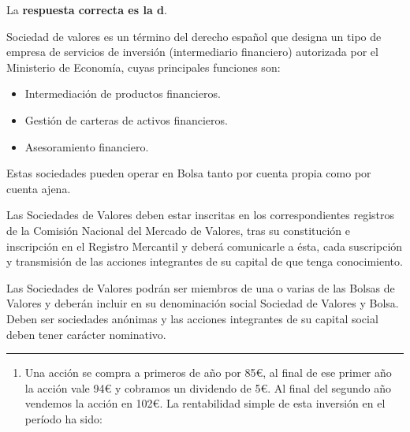 \documentclass[
  letterpaper,
  DIV=11,
  numbers=noendperiod]{scrreprt}
\providecommand{\tightlist}{%
  \setlength{\itemsep}{0pt}\setlength{\parskip}{0pt}}\usepackage{longtable,booktabs,array}
\begin{document}
\begin{tcolorbox}[enhanced jigsaw, left=2mm, opacityback=0, colback=white, breakable, arc=.35mm, bottomrule=.15mm, rightrule=.15mm, toprule=.15mm, leftrule=.75mm, colframe=quarto-callout-tip-color-frame]
\begin{minipage}[t]{5.5mm}
\textcolor{quarto-callout-tip-color}{\faLightbulb}
\end{minipage}%
\begin{minipage}[t]{\textwidth - 5.5mm}

La \textbf{respuesta correcta es la d}.

Sociedad de valores es un término del derecho español que designa un
tipo de empresa de servicios de inversión (intermediario financiero)
autorizada por el Ministerio de Economía, cuyas principales funciones
son:

\begin{itemize}
\item
  Intermediación de productos financieros.
\item
  Gestión de carteras de activos financieros.
\item
  Asesoramiento financiero.
\end{itemize}

Estas sociedades pueden operar en Bolsa tanto por cuenta propia como por
cuenta ajena.

Las Sociedades de Valores deben estar inscritas en los correspondientes
registros de la Comisión Nacional del Mercado de Valores, tras su
constitución e inscripción en el Registro Mercantil y deberá comunicarle
a ésta, cada suscripción y transmisión de las acciones integrantes de su
capital de que tenga conocimiento.

Las Sociedades de Valores podrán ser miembros de una o varias de las
Bolsas de Valores y deberán incluir en su denominación social Sociedad
de Valores y Bolsa. Deben ser sociedades anónimas y las acciones
integrantes de su capital social deben tener carácter nominativo.

\end{minipage}%
\end{tcolorbox}

\begin{center}\rule{0.5\linewidth}{0.5pt}\end{center}

\begin{enumerate}
\def\labelenumi{\arabic{enumi}.}
\setcounter{enumi}{69}
\tightlist
\item
  Una acción se compra a primeros de año por 85€, al final de ese primer
  año la acción vale 94€ y cobramos un dividendo de 5€. Al final del
  segundo año vendemos la acción en 102€. La rentabilidad simple de esta
  inversión en el período ha sido:
\end{enumerate}
\end{document}
